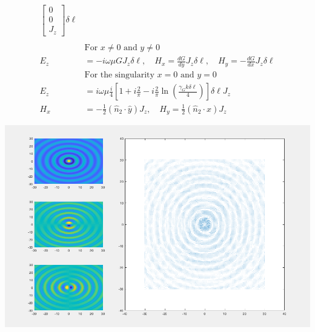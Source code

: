 \documentclass{article}
\renewcommand{\H}{\mathbf{H}}
\renewcommand{\H}{\mathbf{H}}
\newcommand{\0}{\varnothing}
\begin{document}
\begin{minipage}{0.5\textwidth}
\begin{align*}
        \left[ \begin{array}{c} 
        0 \\ 0 \\ J_z \end{array} \right]\delta \ell\\
        \ \\
        &\text{For $x \neq 0$ and $y \neq 0$}\\
        E_z &= -i\omega\mu G J_z \delta \ell, \quad  H_x = \frac{dG}{dy} J_z \delta \ell, \quad H_y = -\frac{dG}{dx} J_z\delta \ell\\
        &\text{For the singularity $x = 0$ and $y = 0$}\\
        E_z &= i\omega\mu \frac{i}{4} \left[ 1 + i \frac{2}{\pi} -  i \frac{2}{\pi} \ln \left(\frac{\gamma_G k \delta \ell}{4}\right) \right] \delta \ell J_z 
        \\H_x &= -\frac{1}{2}(\hat{n}_2 \cdot \hat{y}) J_z , \quad H_y = \frac{1}{2}(\hat{n}_2 \cdot \hat{x}) J_z
\end{align*}
\end{minipage}
\begin{minipage}{0.5\textwidth}
{\centering
\includegraphics[width=1\columnwidth]{figures/JDipole}
}
\end{minipage}
\end{document}
